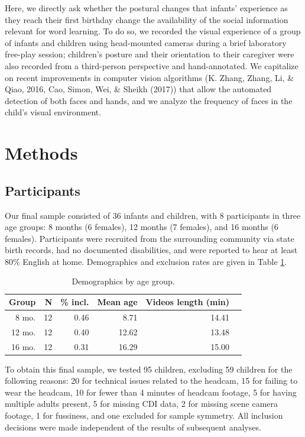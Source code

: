 \documentclass[10pt, letterpaper]{article}
\begin{document}
Here, we directly ask whether the postural changes that infants'
experience as they reach their first birthday change the availability of
the social information relevant for word learning. To do so, we recorded
the visual experience of a group of infants and children using
head-mounted cameras during a brief laboratory free-play session;
children's posture and their orientation to their caregiver were also
recorded from a third-person perspective and hand-annotated. We
capitalize on recent improvements in computer vision algorithms (K.
Zhang, Zhang, Li, \& Qiao, 2016, Cao, Simon, Wei, \& Sheikh (2017)) that
allow the automated detection of both faces and hands, and we analyze
the frequency of faces in the child's visual environment.

\section{Methods}\label{methods}

\subsection{Participants}\label{participants}

Our final sample consisted of 36 infants and children, with 8
participants in three age groups: 8 months (6 females), 12 months (7
females), and 16 months (6 females). Participants were recruited from
the surrounding community via state birth records, had no documented
disabilities, and were reported to hear at least 80\% English at home.
Demographics and exclusion rates are given in Table \ref{tab:pop}.

\begin{table}[H]
\centering
\begin{tabular}{rrrrrr}
  \hline
 Group & N & \% incl. & Mean age & Videos length (min) \\ 
  \hline
   8 mo. &   12 & 0.46 & 8.71 & 14.41 \\ 
   12 mo. &  12 & 0.40 & 12.62 & 13.48 \\ 
   16 mo. &  12 & 0.31 & 16.29 & 15.00\\ 
   \hline
\end{tabular}
\caption{\label{tab:pop} Demographics by age group.}
\end{table}

To obtain this final sample, we tested 95 children, excluding 59
children for the following reasons: 20 for technical issues related to
the headcam, 15 for failing to wear the headcam, 10 for fewer than 4
minutes of headcam footage, 5 for having multiple adults present, 5 for
missing CDI data, 2 for missing scene camera footage, 1 for fussiness,
and one excluded for sample symmetry. All inclusion decisions were made
independent of the results of subsequent analyses.
\end{document}
